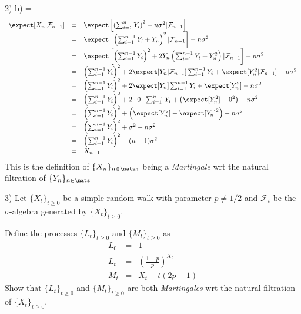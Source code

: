 \documentclass[11pt,a4paper]{article}
\begin{document}
\begin{answer}{2) b)}
  \everymath={\displaystyle}
  \[\begin{array}{rcl}
    \expect[X_n|\mathcal{F}_{n-1}]&=&\expect\left[\left(\sum_{i=1}^nY_i\right)^2-n\sigma^2|\mathcal{F}_{n-1}\right]\\
    &=&\expect\left[\left(\sum_{i=1}^{n-1}Y_i+Y_n\right)^2|\mathcal{F}_{n-1}\right]-n\sigma^2\\
    &=&\expect\left[\left(\sum_{i=1}^{n-1}Y_i\right)^2+2Y_n\left(\sum_{i=1}^{n-1}Y_i+Y_n^2\right)|\mathcal{F}_{n-1}\right]-n\sigma^2\\
    &=&\left(\sum_{i=1}^{n-1}Y_i\right)^2+2\expect[Y_n|\mathcal{F}_{n-1}]\sum_{i=1}^{n-1}Y_i+\expect[Y_n^2|\mathcal{F}_{n-1}]-n\sigma^2\\
    &=&\left(\sum_{i=1}^{n-1}Y_i\right)^2+2\expect[Y_n]\sum_{i=1}^{n-1}Y_i+\expect[Y_n^2]-n\sigma^2\\
    &=&\left(\sum_{i=1}^{n-1}Y_i\right)^2+2\cdot0\cdot\sum_{i=1}^{n-1}Y_i+\left(\expect[Y_n^2]-0^2\right)-n\sigma^2\\
    &=&\left(\sum_{i=1}^{n-1}Y_i\right)^2+\left(\expect[Y_n^2]-\expect[Y_n]^2\right)-n\sigma^2\\
    &=&\left(\sum_{i=1}^{n-1}Y_i\right)^2+\sigma^2-n\sigma^2\\
    &=&\left(\sum_{i=1}^{n-1}Y_i\right)^2-(n-1)\sigma^2\\
    &=&X_{n-1}
  \end{array}\]
  This is the definition of $\{X_n\}_{n\in\nats_0}$ being a \textit{Martingale} wrt the natural filtration of $\{Y_n\}_{n\in\nats}$
\end{answer}

\begin{question}{3)}
  Let $\{X_t\}_{t\geq0}$ be a simple random walk with parameter $p\neq1/2$ and $\mathcal{F}_t$ be the $\sigma$-algebra generated by $\{X_t\}_{t\geq0}$.
  \par Define the processes $\{L_t\}_{t\geq0}$ and $\{M_t\}_{t\geq0}$ as
  \[\begin{array}{rcl}
    L_0&=&1\\
    L_t&=&\left(\frac{1-p}p\right)^{X_t}\\
    M_t&=&X_t-t(2p-1)
  \end{array}\]
  Show that $\{L_t\}_{t\geq0}$ and $\{M_t\}_{t\geq0}$ are both \textit{Martingales} wrt the natural filtration of $\{X_t\}_{t\geq0}$.
\end{question}
\end{document}
